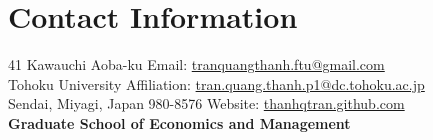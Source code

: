 \section{\sc Contact Information}
41 Kawauchi Aoba-ku      \hfill  Email: \href{mailto:tranquangthanh.ftu@gmail.com}{tranquangthanh.ftu@gmail.com}\\
Tohoku University  	 		\hfill Affiliation: \href{mailto:tran.quang.thanh.p1@dc.tohoku.ac.jp}{tran.quang.thanh.p1@dc.tohoku.ac.jp}\\
Sendai, Miyagi, Japan 980-8576 \hfill Website: \href{https://thanhqtran.github.com}{thanhqtran.github.com} \\
{\bf Graduate School of Economics and Management} \hfill 


